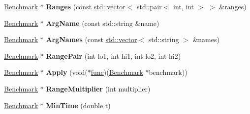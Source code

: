 \begin{DoxyCompactItemize}
\mbox{\hyperlink{classbenchmark_1_1internal_1_1_benchmark}{Benchmark}} $\ast$ {\bfseries Ranges} (const \mbox{\hyperlink{classstd_1_1vector}{std\+::vector}}$<$ std\+::pair$<$ int, int $>$ $>$ \&ranges)
\item 
\mbox{\label{classbenchmark_1_1internal_1_1_benchmark_a0fa63032fd00e19dc0d06409bc845280}} 
\mbox{\hyperlink{classbenchmark_1_1internal_1_1_benchmark}{Benchmark}} $\ast$ {\bfseries Arg\+Name} (const std\+::string \&name)
\item 
\mbox{\label{classbenchmark_1_1internal_1_1_benchmark_a40bc9792fa6238019f6929c91495f9f3}} 
\mbox{\hyperlink{classbenchmark_1_1internal_1_1_benchmark}{Benchmark}} $\ast$ {\bfseries Arg\+Names} (const \mbox{\hyperlink{classstd_1_1vector}{std\+::vector}}$<$ std\+::string $>$ \&names)
\item 
\mbox{\label{classbenchmark_1_1internal_1_1_benchmark_ae7207336eee176ed00746afeacf8ac1f}} 
\mbox{\hyperlink{classbenchmark_1_1internal_1_1_benchmark}{Benchmark}} $\ast$ {\bfseries Range\+Pair} (int lo1, int hi1, int lo2, int hi2)
\item 
\mbox{\label{classbenchmark_1_1internal_1_1_benchmark_aa9c01a213620e85d166d7f3c0ccfc7b1}} 
\mbox{\hyperlink{classbenchmark_1_1internal_1_1_benchmark}{Benchmark}} $\ast$ {\bfseries Apply} (void($\ast$\mbox{\hyperlink{structfunc}{func}})(\mbox{\hyperlink{classbenchmark_1_1internal_1_1_benchmark}{Benchmark}} $\ast$benchmark))
\item 
\mbox{\label{classbenchmark_1_1internal_1_1_benchmark_a9d8fd4d8b2fe3d09714acf7a4001c9f3}} 
\mbox{\hyperlink{classbenchmark_1_1internal_1_1_benchmark}{Benchmark}} $\ast$ {\bfseries Range\+Multiplier} (int multiplier)
\item 
\mbox{\label{classbenchmark_1_1internal_1_1_benchmark_a096f560a82f932f85bc77574b7a4c3e0}} 
\mbox{\hyperlink{classbenchmark_1_1internal_1_1_benchmark}{Benchmark}} $\ast$ {\bfseries Min\+Time} (double t)
\item 
\mbox{\label{classbenchmark_1_1internal_1_1_benchmark_a87de75b63daf1acdb21a26ce9ffc6994}} 

\end{DoxyCompactItemize}
